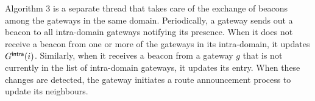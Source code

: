 Algorithm 3 is a separate thread that takes care of the exchange of
beacons among the gateways in the same domain. Periodically, a gateway
sends out a beacon to all intra-domain gateways notifying its
presence. When it does not receive a beacon from one or more of the
gateways in its intra-domain, it updates $G^{\sf intra}(i)$. Similarly, when it
receives a beacon from a gateway $g$ that is not currently in the list
of intra-domain gateways, it updates its entry. When these changes are
detected, the gateway initiates a route announcement process to update
its neighbours.




